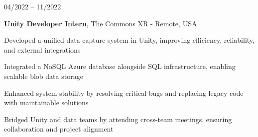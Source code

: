 \begin{twocolentry}{
    04/2022 – 11/2022
}

\fontsize{11 pt}{11 pt}\textbf{Unity Developer Intern}, The Commons XR - Remote, USA\end{twocolentry}

\vspace{0.10 cm}
\begin{onecolentry}
   \begin{highlights}
       \item Developed a unified data capture system in Unity, improving efficiency, reliability, and external integrations
       \item Integrated a NoSQL Azure database alongside SQL infrastructure, enabling scalable blob data storage
       \item Enhanced system stability by resolving critical bugs and replacing legacy code with maintainable solutions
       \item Bridged Unity and data teams by attending cross-team meetings, ensuring collaboration and project alignment
   \end{highlights}
\end{onecolentry}
